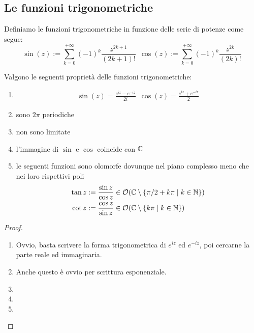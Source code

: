 \subsection{\textcolor{AnComp}{\textbf{Le funzioni trigonometriche}}}
	
	\begin{definition}
		\label{defn:sin-cos}
		Definiamo le funzioni trigonometriche in funzione delle serie di potenze come segue:
		\begin{equation*}
			\sin(z) := \sum^{+\infty}_{k=0} (-1)^k\frac{z^{2k+1}}{(2k+1)!} \;\ \cos(z) := \sum^{+\infty}_{k=0} (-1)^k\frac{z^{2k}}{(2k)!}
		\end{equation*}
	\end{definition}
	
	\begin{theorem}
		Valgono le seguenti proprietà delle funzioni trigonometriche:
		\begin{enumerate}
			\item 
			\begin{equation*}
			\begin{aligned}
				\sin(z) = \frac{e^{iz} - e^{-iz}}{2i} \;\ \cos(z) = \frac{e^{iz} + e^{-iz}}{2}
			\end{aligned}
			\end{equation*}
			\item sono $2\pi$ periodiche
			\item non sono limitate
			\item l'immagine di $\sin$ e $\cos$ coincide con $\mathbb{C}$
			\item le seguenti funzioni sono olomorfe dovunque nel piano complesso meno che nei loro rispettivi poli
			\begin{equation*}
			\begin{aligned}
				\tan z & := \frac{\sin z}{\cos z} \in \mathcal{O}(\mathbb{C} \setminus \{ \pi /2 + k\pi \mid k \in \mathbb{N} \}) \\
				\cot z & := \frac{\cos z}{\sin z} \in \mathcal{O}(\mathbb{C} \setminus \{k\pi \mid k \in \mathbb{N} \})
			\end{aligned}
			\end{equation*}
		\end{enumerate}
	\end{theorem}
	\begin{proof}\ 
	\begin{enumerate}
		\item Ovvio, basta scrivere la forma trigonometrica di $e^{iz}$ ed $e^{-iz}$, poi cercarne la parte reale ed immaginaria.
		\item Anche questo è ovvio per scrittura esponenziale.
		\item
		\item
		\item
	\end{enumerate}
	\end{proof}
	
